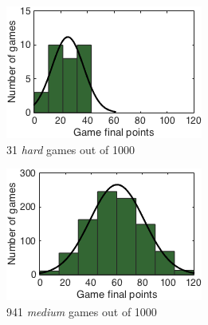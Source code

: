 \cleardoublepage
{}
\label{appendixA}

\begin{figure}[h]
        \centering
        \begin{subfigure}[h]{0.32\textwidth}
                \includegraphics[width=\textwidth]{./img/appendix/histAhard}
                \caption{31 \emph{hard} games out of 1000}
                \label{app:histAhard}
        \end{subfigure}
        \begin{subfigure}[h]{0.32\textwidth}
                \includegraphics[width=\textwidth]{./img/appendix/histAmedium}
                \caption{941 \emph{medium} games out of 1000}
                \label{app:histAmedium}
        \end{subfigure}
        \begin{subfigure}[h]{0.32\textwidth}

\end{subfigure}
\end{figure}
